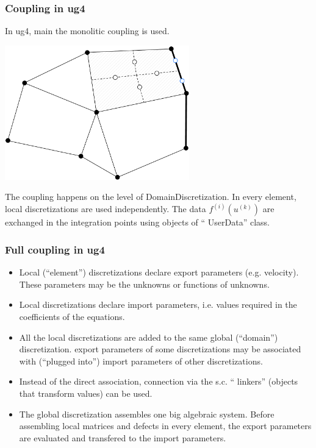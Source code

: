 \begin {frame} [t]
\frametitle {Coupling in ug4}
In ug4, main the monolitic coupling is used.
\centerline {\includegraphics [width=0.6\textwidth] {DiscDetails-Local.pdf}}
The coupling happens on the level of DomainDiscretization. In every element, local
discretizations are used independently. The data $f^{(i)} (u^{(k)})$ are exchanged
in the integration points using objects of ``{\color{blue} UserData}'' class.
\end {frame}

\begin {frame} [t]
\frametitle {Full coupling in ug4}
\vspace{-2ex}
\begin {itemize}
\item Local (``element'') discretizations declare {\color{blue} export parameters}
	(e.g. velocity). These parameters may be the unknowns or functions of unknowns.
\pause
\item Local discretizations declare {\color{blue} import parameters}, i.e. values
	required in the coefficients of the equations.
\pause
\item All the local discretizations are added to the same global (``domain'') discretization.
	export parameters of some discretizations may be associated with (``plugged into'')
	import parameters of other discretizations.
\pause
\item Instead of the direct association, connection via the
	s.c. ``{\color{blue} linkers}'' (objects that transform values) can be used.
\pause
\item The global discretization assembles one big algebraic system. {\color{blue} Before}
	assembling local matrices and defects in every element, the export parameters are
	evaluated and transfered to the import parameters.
\end {itemize}
\end {frame}

